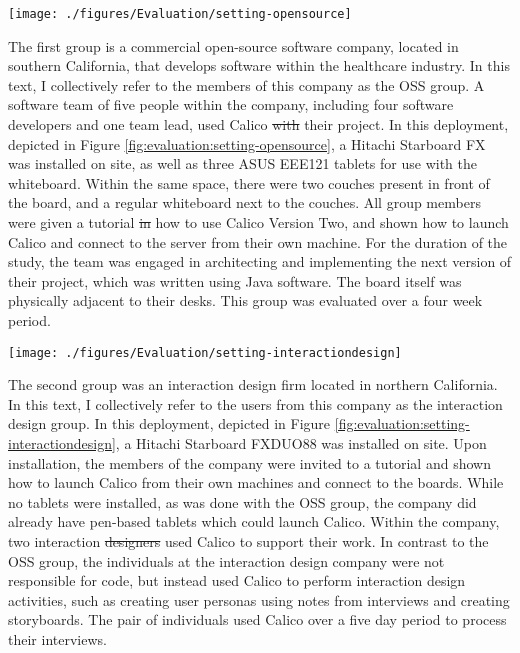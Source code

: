 \documentclass[12pt,fleqn]{ucithesis}
\providecommand{\DIFaddtex}[1]{{\protect\color{blue}\uwave{#1}}} %
\providecommand{\DIFdeltex}[1]{{\protect\color{red}\sout{#1}}}                      %
\providecommand{\DIFaddbegin}{} %
\providecommand{\DIFaddend}{} %
\providecommand{\DIFdelbegin}{} %
\providecommand{\DIFdelend}{} %
\providecommand{\DIFadd}[1]{\texorpdfstring{\DIFaddtex{#1}}{#1}} %
\providecommand{\DIFdel}[1]{\texorpdfstring{\DIFdeltex{#1}}{}} %
\begin{document}
\begin{figure*}[tbh]
  \centering
  \texttt{[image: ./figures/Evaluation/setting-opensource]}
  \caption{The physical setup at the commercial OSS company}
  \label{fig:evaluation:setting-opensource}
\end{figure*}

The first group is a commercial open-source software company, located in southern California, that develops software within the healthcare industry. In this text, I collectively refer to the members of this company as the OSS group. A software team of five people within the company, including four software developers and one team lead, used Calico \DIFdelbegin \DIFdel{with }\DIFdelend \DIFaddbegin \DIFadd{in }\DIFaddend their project. In this deployment, depicted in Figure \ref{fig:evaluation:setting-opensource}, a Hitachi Starboard FX was installed on site, as well as three ASUS EEE121 tablets for use with the whiteboard. Within the same space, there were two couches present in front of the board, and a regular whiteboard next to the couches. All group members were given a tutorial \DIFdelbegin \DIFdel{in }\DIFdelend \DIFaddbegin \DIFadd{on }\DIFaddend how to use Calico Version Two, and shown how to launch Calico and connect to the server from their own machine.  For the duration of the study, the team was engaged in architecting and implementing the next version of their project, which was written using Java software. The board itself was physically adjacent to their desks. This group was evaluated over a four week period.

\begin{figure*}[tbh]
  \centering
  \texttt{[image: ./figures/Evaluation/setting-interactiondesign]}
  \caption{TODO: HAVE JIM APPROVE IMAGE A tutorial of the usage of Calico given to the interaction design group}
  \label{fig:evaluation:setting-interactiondesign}
\end{figure*}

The second group was an interaction design firm located in northern California. In this text, I collectively refer to the users from this company as the interaction design group. In this deployment, depicted in Figure \ref{fig:evaluation:setting-interactiondesign}, a Hitachi Starboard FXDUO88 was installed on site. Upon installation, the members of the company were invited to a tutorial and shown how to launch Calico from their own machines and connect to the boards. While no tablets were installed, as was done with the OSS group, the company did already have pen-based tablets which could launch Calico. Within the company, two interaction \DIFdelbegin \DIFdel{designers }\DIFdelend \DIFaddbegin \DIFadd{design group }\DIFaddend used Calico to support their work. In contrast to the OSS group, the individuals at the interaction design company were not responsible for code, but instead used Calico to perform interaction design activities, such as creating user personas using notes from interviews and creating storyboards. The pair of individuals used Calico over a five day period to process their interviews.
\end{document}
